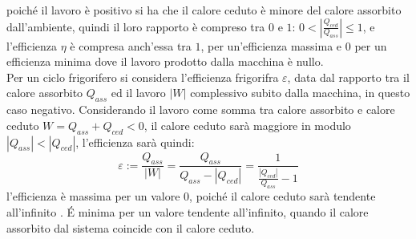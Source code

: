 \documentclass{article}
\numberwithin{equation}{subsection}
\begin{document}
poiché il lavoro è positivo si ha che il calore ceduto  
è minore del calore assorbito dall'ambiente, quindi il loro 
rapporto è compreso tra $0$ e $1$: $0<\left|\displaystyle\frac{Q_{ced}}{Q_{ass}}\right|\leq1$, 
e l'efficienza $\eta$ è compresa anch'essa tra $1$, per 
un'efficienza massima e $0$ per un efficienza minima dove il 
lavoro prodotto dalla macchina è nullo.\\
Per un ciclo frigorifero si considera l'efficienza frigorifra $\varepsilon$, 
data dal rapporto tra il calore assorbito $Q_{ass}$ ed il lavoro 
$\left|W\right|$ complessivo subito dalla macchina, in questo caso negativo. 
Considerando il lavoro come somma tra calore assorbito e calore 
ceduto $W=Q_{ass}+Q_{ced}<0$, il calore ceduto sarà maggiore in modulo 
$\left|Q_{ass}\right|<\left|Q_{ced}\right|$, l'efficienza sarà 
quindi:
\begin{equation}
    \varepsilon:=\displaystyle\frac{Q_{ass}}{\left|W\right|}=\displaystyle\frac{Q_{ass}}{Q_{ass}-\left|Q_{ced}\right|}=\frac{1}{\displaystyle\frac{|Q_{ced}|}{Q_{ass}}-1}
\end{equation}
l'efficienza è massima per un valore $0$, poiché il calore 
ceduto sarà tendente all'infinito 
. \'{E} minima 
per un valore tendente all'infinito, quando il calore assorbito 
dal sistema coincide con il calore ceduto. 
\end{document}
